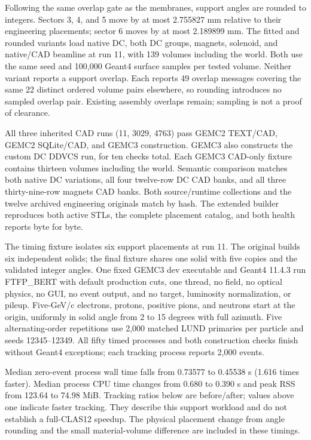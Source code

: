 Following the same overlap gate as the membranes, support angles are rounded to integers. Sectors 3, 4, and 5
move by at most 2.755827 mm relative to their engineering placements; sector 6 moves by at most 2.189899 mm.
The fitted and rounded variants load native DC, both DC groups, magnets, solenoid, and native/CAD beamline at
run 11, with 139 volumes including the world. Both use the same seed and 100,000 Geant4 surface samples per
tested volume. Neither variant reports a support overlap. Each reports 49 overlap messages covering the same
22 distinct ordered volume pairs elsewhere, so rounding introduces no sampled overlap pair. Existing assembly
overlaps remain; sampling is not a proof of clearance.

All three inherited CAD runs (11, 3029, 4763) pass GEMC2 TEXT/CAD, GEMC2 SQLite/CAD, and GEMC3 construction.
GEMC3 also constructs the custom DC DDVCS run, for ten checks total. Each GEMC3 CAD-only fixture contains
thirteen volumes including the world. Semantic comparison matches both native DC variations, all four
twelve-row DC CAD banks, and all three thirty-nine-row magnets CAD banks. Both source/runtime collections and
the twelve archived engineering originals match by hash. The extended builder reproduces both active STLs, the
complete placement catalog, and both health reports byte for byte.

The timing fixture isolates six support placements at run 11. The original builds six independent solids; the
final fixture shares one solid with five copies and the validated integer angles. One fixed GEMC3 dev
executable and Geant4 11.4.3 run FTFP\_BERT with default production cuts, one thread, no field, no optical
physics, no GUI, no event output, and no target, luminosity normalization, or pileup. Five-GeV/c electrons,
protons, positive pions, and neutrons start at the origin, uniformly in solid angle from 2 to 15 degrees with
full azimuth. Five alternating-order repetitions use 2,000 matched LUND primaries per particle and seeds
12345--12349. All fifty timed processes and both construction checks finish without Geant4 exceptions; each
tracking process reports 2,000 events.

Median zero-event process wall time falls from 0.73577 to 0.45538 s (1.616 times faster). Median process CPU
time changes from 0.680 to 0.390 s and peak RSS from 123.64 to 74.98 MiB. Tracking ratios below are
before/after; values above one indicate faster tracking. They describe this support workload and do not
establish a full-CLAS12 speedup. The physical placement change from angle rounding and the small
material-volume difference are included in these timings.

